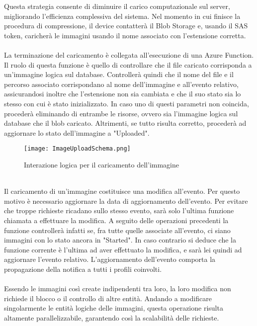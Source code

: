 Questa strategia consente di diminuire il carico computazionale sul server, 
migliorando l'efficienza complessiva del sistema.
Nel momento in cui finisce la procedura di compressione, il device contatterà il Blob Storage e,
usando il SAS token, caricherà le immagini usando il nome associato con l'estensione corretta.\\
\\
La terminazione del caricamento è collegata all'esecuzione di una Azure Function.
Il ruolo di questa funzione è quello di controllare che il file caricato corrisponda
a un'immagine logica sul database.
Controllerà quindi che il nome del file e il percorso associato corrispondano 
al nome dell'immagine e all'evento relativo, 
assicurandosi inoltre che l'estensione non sia cambiata 
e che il suo stato sia lo stesso con cui è stato inizializzato.
In caso uno di questi parametri non coincida, 
procederà eliminando di entrambe le risorse, 
ovvero sia l'immagine logica sul database che il blob caricato.
Altrimenti, se tutto risulta corretto,
procederà ad aggiornare lo stato dell'immagine a "Uploaded".\\
\begin{figure}[h!]
    \centering
    \texttt{[image: ImageUploadSchema.png]}
    \caption{Interazione logica per il caricamento dell'immagine}
\end{figure}
\\
Il caricamento di un'immagine costituisce una modifica all'evento.
Per questo motivo è necessario aggiornare la data di aggiornamento dell'evento.
Per evitare che troppe richieste ricadano sullo stesso evento,
sarà solo l'ultima funzione chiamata a effettuare la modifica.
A seguito delle operazioni precedenti la funzione controllerà infatti se, 
fra tutte quelle associate all'evento, ci siano immagini con lo stato ancora in "Started".
In caso contrario si deduce che la funzione corrente è l'ultima ad aver effettuato la modifica,
e sarà lei quindi ad aggiornare l'evento relativo.
L'aggiornamento dell'evento comporta la propagazione della notifica a tutti i profili coinvolti.\\
\\
Essendo le immagini così create indipendenti tra loro,
la loro modifica non richiede il blocco o il controllo di altre entità.
Andando a modificare singolarmente le entità logiche delle immagini,
questa operazione risulta altamente parallelizzabile,
garantendo così la scalabilità delle richieste.\\
\\
